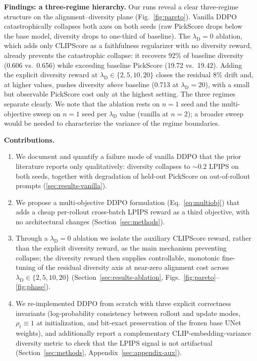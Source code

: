 \documentclass[10pt,letterpaper]{article}
\newcommand{\paragraphhead}[1]{\vspace{0.4ex}\noindent\textbf{#1}\hspace{0.5em}}
\newcommand{\lambdaD}{\lambda_{\mathrm{D}}}
\begin{document}
\paragraphhead{Findings: a three-regime hierarchy.}
Our runs reveal a clear three-regime structure on the alignment--diversity plane (Fig.~\ref{fig:pareto}). Vanilla DDPO catastrophically collapses both axes on both seeds (raw PickScore drops below the base model, diversity drops to one-third of baseline). The $\lambdaD{=}0$ ablation, which adds only CLIPScore as a faithfulness regularizer with no diversity reward, already prevents the catastrophic collapse: it recovers 92\% of baseline diversity (0.606 vs.\ 0.656) while exceeding baseline PickScore (19.72 vs.\ 19.42). Adding the explicit diversity reward at $\lambdaD \in \{2, 5, 10, 20\}$ closes the residual 8\% drift and, at higher values, pushes diversity \emph{above} baseline (0.713 at $\lambdaD{=}20$), with a small but observable PickScore cost only at the highest setting. The three regimes separate clearly. We note that the ablation rests on $n{=}1$ seed and the multi-objective sweep on $n{=}1$ seed per $\lambdaD$ value (vanilla at $n{=}2$); a broader sweep would be needed to characterize the variance of the regime boundaries.

\paragraphhead{Contributions.}
\begin{enumerate}
  \item We document and quantify a failure mode of vanilla DDPO that the prior literature reports only qualitatively: diversity collapses to ${\sim}0.2$ LPIPS on both seeds, together with degradation of held-out PickScore on out-of-rollout prompts (\ref{sec:results-vanilla}).
  \item We propose a multi-objective DDPO formulation (Eq.~\ref{eq:multiobj}) that adds a cheap per-rollout cross-batch LPIPS reward as a third objective, with no architectural changes (Section~\ref{sec:methods}).
  \item Through a $\lambdaD{=}0$ ablation we isolate the auxiliary CLIPScore reward, rather than the explicit diversity reward, as the main mechanism preventing collapse; the diversity reward then supplies controllable, monotonic fine-tuning of the residual diversity axis at near-zero alignment cost across $\lambdaD \in \{2, 5, 10, 20\}$ (Section~\ref{sec:results-ablation}, Figs.~\ref{fig:pareto}--\ref{fig:phase}).
  \item We re-implemented DDPO from scratch with three explicit correctness invariants (log-probability consistency between rollout and update modes, $\rho_t \equiv 1$ at initialization, and bit-exact preservation of the frozen base UNet weights), and additionally report a complementary CLIP-embedding-variance diversity metric to check that the LPIPS signal is not artifactual (Section~\ref{sec:methods}, Appendix~\ref{sec:appendix-aux}).
\end{enumerate}
\end{document}
